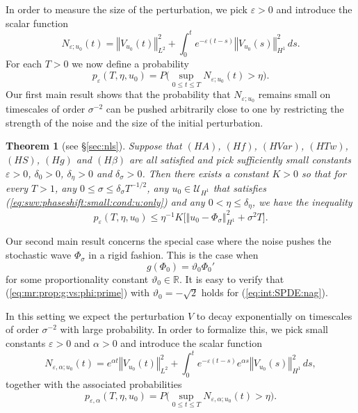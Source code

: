 \documentclass[10pt]{articleHJ}
\newcommand{\e}{\ensuremath{\varepsilon}}
\newcommand{\Real}{\mathbb{R}}							%
\newcommand{\norm}[1]{\left\Vert#1\right\Vert}		%
\newcommand{\sref}[1]{(\ref{#1})}                       %
\newtheorem{thm}{Theorem}[section]
\numberwithin{equation}{section}
\begin{document}
In order to measure the size
of the perturbation,
we pick $\e > 0$
and introduce the scalar function
\begin{equation}
N_{\e;u_0} (t) =
\norm{V_{u_0}(t)}_{L^2}^2
 + \int_0^t e^{- \e (t - s) }
    \norm{  V_{u_0}(s)}_{H^1}^2 \, ds .
\end{equation}
For each $T > 0$ we now define
a probability
\begin{equation}
p_{\e}(T, \eta, u_0) = P\Big(
 \sup_{0 \le t \le T}
 N_{\e;u_0}(t) > \eta
\Big) .
\end{equation}
Our first main result shows that
the probability that
$N_{\e;u_0}$ remains
small on timescales of order $\sigma^{-2}$ can be pushed arbitrarily close to one
by restricting the strength of the noise
and the size of the initial perturbation.



\begin{thm}[{see \S\ref{sec:nls}}]
\label{thm:mr:orbital:stb}
Suppose that $(HA)$, $(Hf)$, $(HVar)$,
$(HTw)$, $(HS)$, $(Hg)$ and $(H\beta)$ are all satisfied
and pick sufficiently small constants $\e > 0$, $\delta_0>0$,
$\delta_{\eta} > 0$ and $\delta_{\sigma} > 0$.
Then there exists a constant $K > 0$
so that for every $T> 1$, any $0 \le \sigma \le \delta_{\sigma}T^{-1/2}$,
any $u_0 \in \mathcal{U}_{H^1}$
that satisfies \sref{eq:swv:phaseshift:small:cond:u:only}
and any $0 < \eta \le \delta_{\eta}$,
we have the inequality
\begin{equation}
p_{\e}(T, \eta, u_0)
  \le   \eta^{-1} K \Big[ \norm{u_0 - \Phi_{\sigma}}_{H^1}^2
     + \sigma^2 T \Big].
\end{equation}
\end{thm}

Our second main result concerns the
special case
where the noise pushes the stochastic wave
$\Phi_{\sigma}$ in a rigid fashion.
This is the case when
\begin{equation}
\label{eq:mr:prop:g:vs:phi:prime}
g(\Phi_0) = \vartheta_0 \Phi_0'
\end{equation}
for some proportionality constant
$\vartheta_0 \in \Real$.
It is easy to verify that
\sref{eq:mr:prop:g:vs:phi:prime}
with $\vartheta_0 = - \sqrt{2}$
holds for \sref{eq:int:SPDE:nag}.





In this setting we expect the perturbation $V$ to decay
exponentially on timescales of order $\sigma^{-2}$ with large probability.
In order to formalize this, we pick small constants
$\e > 0$ and $\alpha > 0$
and introduce the scalar function
\begin{equation}
N_{\e,\alpha;u_0}(t) =
e^{\alpha t} \norm{V_{u_0}(t)}_{L^2}^2
 + \int_0^t e^{- \e (t - s) }
    e^{\alpha s} \norm{  V_{u_0}(s)}_{H^1}^2 \, ds ,
\end{equation}
together with the associated probabilities
\begin{equation}
\label{eq:mr:def:p:eps:alpha}
p_{\e,\alpha}(T,\eta, u_0) = P\Big(
 \sup_{0 \le t \le T}  N_{\e,\alpha;u_0}(t)
 > \eta
\Big) .
\end{equation}
\end{document}
